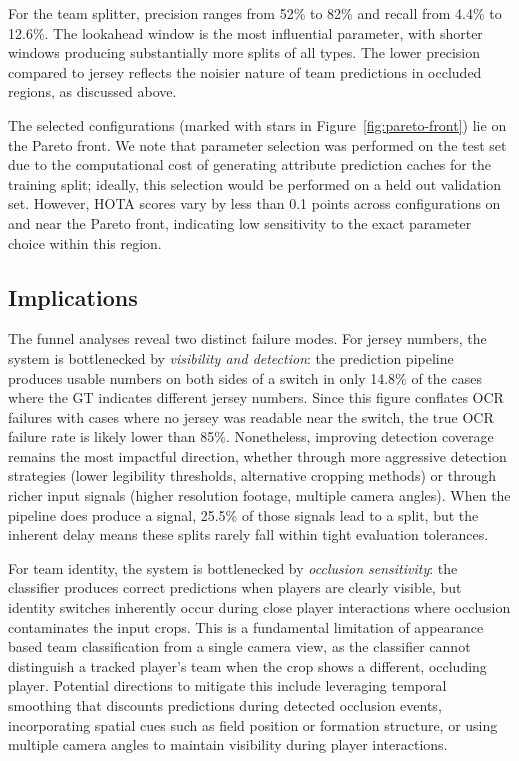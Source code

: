 For the team splitter, precision ranges from 52\% to 82\% and recall from 4.4\% to 12.6\%. The lookahead window is the most influential parameter, with shorter windows producing substantially more splits of all types. The lower precision compared to jersey reflects the noisier nature of team predictions in occluded regions, as discussed above.

The selected configurations (marked with stars in Figure~\ref{fig:pareto-front}) lie on the Pareto front. We note that parameter selection was performed on the test set due to the computational cost of generating attribute prediction caches for the training split; ideally, this selection would be performed on a held out validation set. However, HOTA scores vary by less than 0.1 points across configurations on and near the Pareto front, indicating low sensitivity to the exact parameter choice within this region.

\subsection{Implications}\label{subsec:attribute-implications}

The funnel analyses reveal two distinct failure modes. For jersey numbers, the system is bottlenecked by \emph{visibility and detection}: the prediction pipeline produces usable numbers on both sides of a switch in only 14.8\% of the cases where the GT indicates different jersey numbers. Since this figure conflates OCR failures with cases where no jersey was readable near the switch, the true OCR failure rate is likely lower than 85\%. Nonetheless, improving detection coverage remains the most impactful direction, whether through more aggressive detection strategies (lower legibility thresholds, alternative cropping methods) or through richer input signals (higher resolution footage, multiple camera angles). When the pipeline does produce a signal, 25.5\% of those signals lead to a split, but the inherent delay means these splits rarely fall within tight evaluation tolerances.

For team identity, the system is bottlenecked by \emph{occlusion sensitivity}: the classifier produces correct predictions when players are clearly visible, but identity switches inherently occur during close player interactions where occlusion contaminates the input crops. This is a fundamental limitation of appearance based team classification from a single camera view, as the classifier cannot distinguish a tracked player's team when the crop shows a different, occluding player. Potential directions to mitigate this include leveraging temporal smoothing that discounts predictions during detected occlusion events, incorporating spatial cues such as field position or formation structure, or using multiple camera angles to maintain visibility during player interactions.

